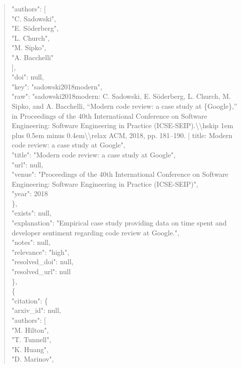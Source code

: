 \documentclass[11pt]{article}
\begin{document}
\begin{quote}
        "authors": [\\
          "C. Sadowski",\\
          "E. Söderberg",\\
          "L. Church",\\
          "M. Sipko",\\
          "A. Bacchelli"\\
        ],\\
        "doi": null,\\
        "key": "sadowski2018modern",\\
        "raw": "sadowski2018modern: C. Sadowski, E. Söderberg, L. Church, M. Sipko, and A. Bacchelli, ``Modern code review: a case study at \{Google\},'' in Proceedings of the 40th International Conference on Software Engineering: Software Engineering in Practice (ICSE-SEIP).\textbackslash{}\textbackslash{}hskip 1em plus 0.5em minus 0.4em\textbackslash{}\textbackslash{}relax ACM, 2018, pp. 181--190. | title: Modern code review: a case study at Google",\\
        "title": "Modern code review: a case study at Google",\\
        "url": null,\\
        "venue": "Proceedings of the 40th International Conference on Software Engineering: Software Engineering in Practice (ICSE-SEIP)",\\
        "year": 2018\\
      \},\\
      "exists": null,\\
      "explanation": "Empirical case study providing data on time spent and developer sentiment regarding code review at Google.",\\
      "notes": null,\\
      "relevance": "high",\\
      "resolved\_doi": null,\\
      "resolved\_url": null\\
    \},\\
    \{\\
      "citation": \{\\
        "arxiv\_id": null,\\
        "authors": [\\
          "M. Hilton",\\
          "T. Tunnell",\\
          "K. Huang",\\
          "D. Marinov",\\

\end{quote}
\end{document}
